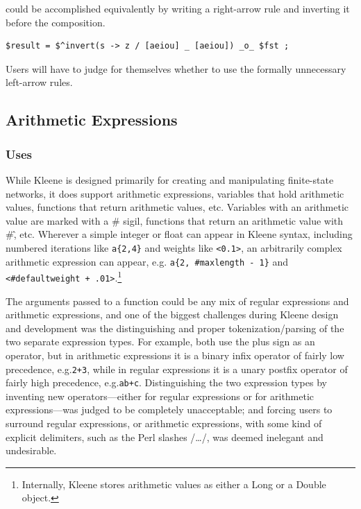 \documentclass[letterpaper,12pt]{article}
\newcommand{\Kleene}{Kleene\xspace}
\begin{document}
\noindent
could be accomplished equivalently by writing a right-arrow rule
and inverting it before the composition.


\begin{Verbatim}[fontsize=\small]
$result = $^invert(s -> z / [aeiou] _ [aeiou]) _o_ $fst ;
\end{Verbatim}

\noindent 
Users will have to judge for themselves whether to use
the formally unnecessary left-arrow rules.


\subsection{Arithmetic Expressions}

\subsubsection{Uses}

While \Kleene{} is designed primarily for creating and manipulating
finite-state networks, it does support arithmetic expressions, variables
that hold arithmetic values, functions that return arithmetic values,
etc.  Variables with an arithmetic value are marked with a \# sigil,
functions that return an arithmetic value with \#\^, etc.  Wherever a
simple integer or float can appear in \Kleene{} syntax, including
numbered iterations like \verb!a{2,4}! and weights like \verb!<0.1>!, an
arbitrarily complex arithmetic expression can appear, e.g.\@ 
\verb!a{2, #maxlength - 1}! and \verb!<#defaultweight + .01>!.\footnote{Internally,
\Kleene{} stores arithmetic values as either a Long or a Double object.}

The arguments passed to a function could be any mix of regular
expressions and arithmetic expressions, and one of the biggest challenges
during \Kleene{} design and development was the distinguishing and proper
tokenization/parsing of the two separate expression types.  For example,
both use the plus sign as an operator, but in arithmetic expressions it
is a binary infix operator of fairly low precedence, e.g.\@  \verb!2+3!,
while in regular expressions it is a unary postfix operator of fairly
high precedence, e.g.\@ \verb!ab+c!.  Distinguishing the two
expression types by inventing new operators---either for regular
expressions or for arithmetic expressions---was judged to be
completely unacceptable; and forcing users to surround regular
expressions, or arithmetic expressions, with some kind of explicit
delimiters, such as the Perl slashes /\ldots/, was deemed inelegant
and undesirable.
\end{document}
